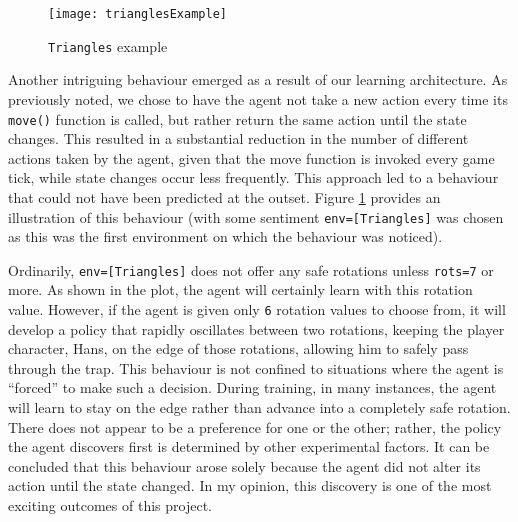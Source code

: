 \begin{figure}[h]
    \centering
    \texttt{[image: trianglesExample]}
    \caption{\texttt{Triangles} example}
    \label{fig:triangles_intbeh_eg}
\end{figure}

Another intriguing behaviour emerged as a result of our learning architecture. As previously noted, we chose to have the agent not take a new action every time its \texttt{move()} function is called, but rather return the same action until the state changes. This resulted in a substantial reduction in the number of different actions taken by the agent, given that the move function is invoked every game tick, while state changes occur less frequently. This approach led to a behaviour that could not have been predicted at the outset. Figure \ref{fig:triangles_intbeh_eg} provides an illustration of this behaviour (with some sentiment \texttt{env=[Triangles]} was chosen as this was the first environment on which the behaviour was noticed).

Ordinarily, \texttt{env=[Triangles]} does not offer any safe rotations unless \texttt{rots=7} or more. As shown in the plot, the agent will certainly learn with this rotation value. However, if the agent is given only \texttt{6} rotation values to choose from, it will develop a policy that rapidly oscillates between two rotations, keeping the player character, Hans, on the edge of those rotations, allowing him to safely pass through the trap. This behaviour is not confined to situations where the agent is ``forced'' to make such a decision. During training, in many instances, the agent will learn to stay on the edge rather than advance into a completely safe rotation. There does not appear to be a preference for one or the other; rather, the policy the agent discovers first is determined by other experimental factors. It can be concluded that this behaviour arose solely because the agent did not alter its action until the state changed. In my opinion, this discovery is one of the most exciting outcomes of this project.